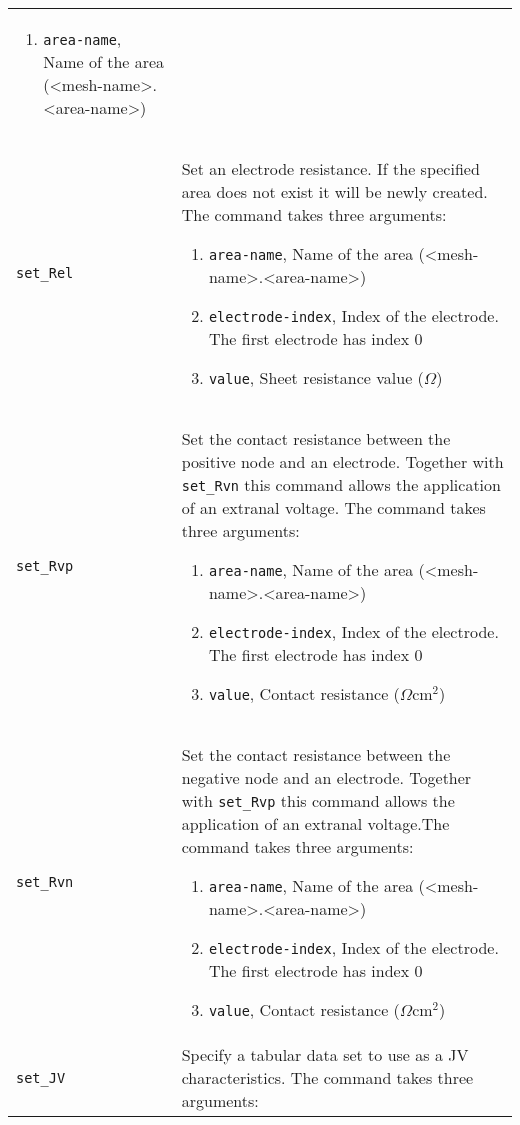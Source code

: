 \documentclass[noshowpacs,preprintnumbers,amsmath,amssymb, letter]{revtex4}
\begin{document}
\begin{longtable}{p{}p{}}
\begin{enumerate}
\item \texttt{area-name}, Name of the area (\textless mesh-name\textgreater .\textless area-name\textgreater )
\end{enumerate}\\
\texttt{set\_Rel}	&  Set an electrode resistance. If the specified area does not exist it will be newly created. The command takes three arguments:
\begin{enumerate}
\item \texttt{area-name}, Name of the area (\textless mesh-name\textgreater .\textless area-name\textgreater )
\item \texttt{electrode-index}, Index of the electrode. The first electrode has index 0
\item \texttt{value}, Sheet resistance value ($\Omega$)
\end{enumerate}\\
\texttt{set\_Rvp}	&  Set the contact resistance between the positive node and an electrode. Together with \texttt{set\_Rvn} this command allows the application of an extranal voltage. The command takes three arguments:
\begin{enumerate}
\item \texttt{area-name}, Name of the area (\textless mesh-name\textgreater .\textless area-name\textgreater )
\item \texttt{electrode-index}, Index of the electrode. The first electrode has index 0
\item \texttt{value}, Contact resistance ($\Omega \text{cm}^2$)
\end{enumerate}\\
\texttt{set\_Rvn}	&  Set the contact resistance between the negative node and an electrode. Together with \texttt{set\_Rvp} this command allows the application of an extranal voltage.The command takes three arguments:
\begin{enumerate}
\item \texttt{area-name}, Name of the area (\textless mesh-name\textgreater .\textless area-name\textgreater )
\item \texttt{electrode-index}, Index of the electrode. The first electrode has index 0
\item \texttt{value}, Contact resistance ($\Omega \text{cm}^2$)
\end{enumerate}\\
\texttt{set\_JV}	&  Specify a tabular data set to use as a JV characteristics. The command takes three arguments:

\end{longtable}
\end{document}
